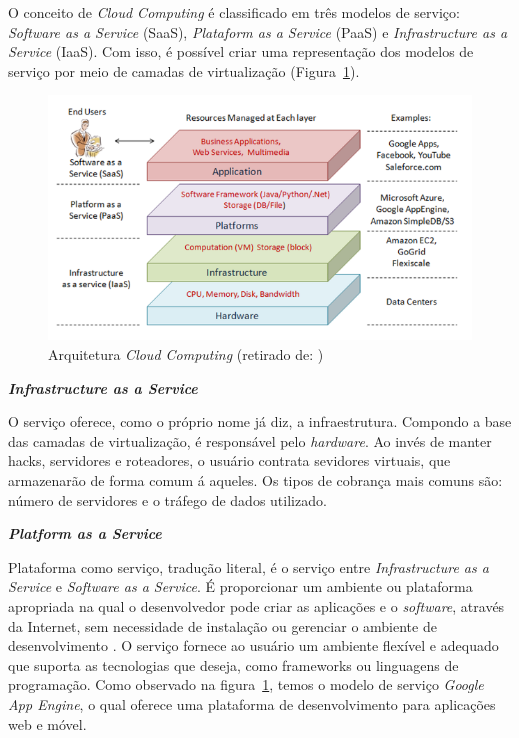 \documentclass[12pt]{article}
\begin{document}
O conceito de \textit{Cloud Computing} é classificado em três modelos de serviço: \textit{Software as a Service} (SaaS), \textit{Plataform as a Service} (PaaS) e \textit{Infrastructure as a Service} (IaaS). Com isso, é possível criar uma representação dos modelos de serviço por meio de camadas de virtualização (Figura~\ref{fig:architeture}).

\begin{figure}[ht]
\centering
\includegraphics[width=.9\textwidth]{architeture.png}
\caption{Arquitetura \textit{Cloud Computing} (retirado de: \cite{2})}
\label{fig:architeture}
\end{figure}

\textbf{\textit{Infrastructure as a Service}}

O serviço oferece, como o próprio nome já diz, a infraestrutura. Compondo a base das camadas de virtualização, é responsável pelo \textit{hardware}.
Ao invés de manter hacks, servidores e roteadores, o usuário contrata sevidores virtuais, que armazenarão de forma comum á aqueles. Os tipos de cobrança mais comuns são: número de servidores e o tráfego de dados utilizado.

\textbf{\textit{Platform as a Service}}

Plataforma como serviço, tradução literal, é o serviço entre \textit{Infrastructure as a Service} e \textit{Software as a Service}. É proporcionar um ambiente ou plataforma apropriada na qual o desenvolvedor pode criar as aplicações e o \textit{software}, através da Internet, sem necessidade de instalação ou gerenciar o ambiente de desenvolvimento \cite{1}. O serviço fornece ao usuário um ambiente flexível e adequado que suporta as tecnologias que deseja, como frameworks ou linguagens de programação. Como observado na figura~\ref{fig:architeture}, temos o modelo de serviço \textit{Google App Engine}, o qual oferece uma plataforma de desenvolvimento para aplicações web e móvel.
\end{document}
